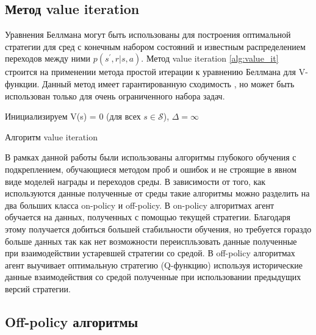  
\subsection{Метод value iteration}

Уравнения Беллмана могут быть использованы для построения оптимальной стратегии для сред с конечным набором состояний и известным распределением переходов между ними $p(s^{\prime}, r|s, a)$. Метод value iteration \ref{alg:value_it} строится на применении метода простой итерации к уравнению Беллмана для V-функции. Данный метод имеет гарантированную сходимость \cite{Sutton1998}, но может быть использован только для очень ограниченного набора задач.

\begin{algorithm}[ht]
	\SetAlgoLined
	Инициализируем V(s) = 0 (для всех $s \in \mathcal{S}$), $\Delta = \infty$\;
	\caption{Алгоритм value iteration}
	\label{alg:value_it}

\end{algorithm}

В рамках данной работы были использованы алгоритмы глубокого обучения с подкреплением, обучающиеся методом проб и ошибок и не строящие в явном виде моделей награды и переходов среды. В зависимости от того, как используются данные полученные от среды такие алгоритмы можно разделить на два больших класса on-policy и off-policy. В on-policy алгоритмах агент обучается на данных, полученных с помощью текущей стратегии. Благодаря этому получается добиться большей стабильности обучения, но требуется гораздо больше данных так как нет возможности переиспльзовать данные полученные при взаимодействии устаревшей стратегии со средой. 
В off-policy алгоритмах агент выучивает оптимальную стратегию (Q-функцию) используя исторические данные взаимодействия со средой полученные при использовании предыдущих версий стратегии. 

\subsection{Off-policy алгоритмы}

